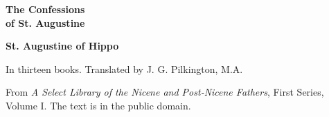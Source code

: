 \documentclass[11pt,letterpaper]{article}
\begin{document}
\color{ink}

\begin{titlepage}
\centering
\vspace*{4em}
{\LARGE\bfseries\color{heading} The Confessions\\[0.3em]of St. Augustine\par}
\vspace{2em}
{\Large\bfseries\color{heading} St. Augustine of Hippo\par}
\vspace{2.5em}
{\itshape\color{subhead}\parbox{0.8\linewidth}{\centering In thirteen books. Translated by J. G. Pilkington, M.A.\par}}
\vfill
{\small From \emph{A Select Library of the Nicene and Post-Nicene Fathers}, First Series, Volume I. The text is in the public domain.\par}
\vspace{2em}
\end{titlepage}

\tableofcontents


\end{document}
